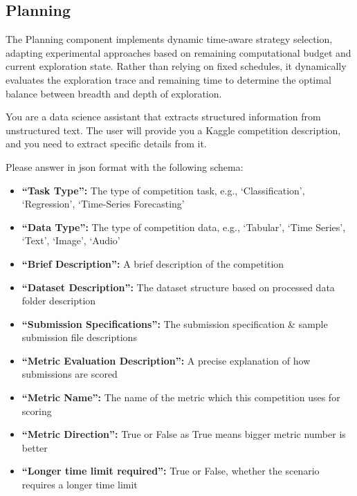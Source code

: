 \subsection{Planning}

The Planning component implements dynamic time-aware strategy selection, adapting experimental approaches based on remaining computational budget and current exploration state. Rather than relying on fixed schedules, it dynamically evaluates the exploration trace and remaining time to determine the optimal balance between breadth and depth of exploration.


\begin{tcolorbox}[
  colback=gray!5,
  colframe=gray!80,
  title=Competition Analysis Prompt –--- Planning Component,
  breakable
]
You are a data science assistant that extracts structured information from unstructured text.
The user will provide you a Kaggle competition description, and you need to extract specific details from it.

Please answer in json format with the following schema:
\begin{itemize}
\item \textbf{``Task Type'':} The type of competition task, e.g., `Classification', `Regression', `Time-Series Forecasting'     \item \textbf{``Data Type'':} The type of competition data, e.g., `Tabular', `Time Series', `Text', `Image', `Audio'
\item \textbf{``Brief Description'':} A brief description of the competition     \item \textbf{``Dataset Description'':} The dataset structure based on processed data folder description
\item \textbf{``Submission Specifications'':} The submission specification \& sample submission file descriptions     \item \textbf{``Metric Evaluation Description'':} A precise explanation of how submissions are scored
\item \textbf{``Metric Name'':} The name of the metric which this competition uses for scoring     
\item \textbf{``Metric Direction'':} True or False as True means bigger metric number is better
\item \textbf{``Longer time limit required'':} True or False, whether the scenario requires a longer time limit
\end{itemize}
\end{tcolorbox}

